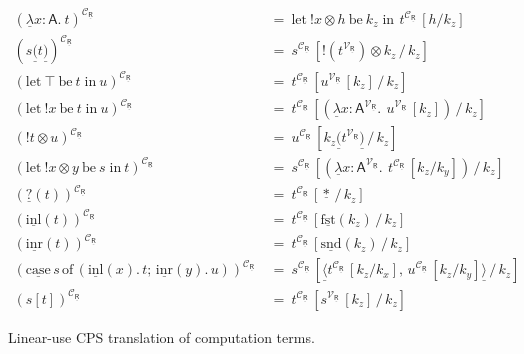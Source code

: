 \documentclass{LMCS}
\newcommand{\comptype}[1]{\underline{#1}}
\newcommand{\VA}{\mathsf{A}}
\newcommand{\CR}{\comptype{\mathsf{R}}}
\newcommand{\In}[2]{#1 \colon  \! #2}
\newcommand{\compop}[1]{\underline{#1}}
\newcommand{\Cstar}{\compop{*}}
\newcommand{\Cpair}[2]{\compop{\langle} #1 , #2 \compop{\rangle}}
\newcommand{\Cfst}[1]{\compop{\mathrm{fst}}(#1)}
\newcommand{\Csnd}[1]{\compop{\mathrm{snd}}(#1)}
\newcommand{\Clam}[3]{\compop{\lambda} \In{#1}{#2}.\: #3}
\newcommand{\Cappl}[2]{#1\compop{(}#2\compop{)}}
\newcommand{\bang}[1]{{! #1}}
\newcommand{\Itop}{\top}
\newcommand{\Ilet}[2]{\mathrm{let}\: {\Itop}\:\mathrm{be}\:{#1} \;\mathrm{in}\: #2}
\newcommand{\banglet}[3]{\mathrm{let}\: {\bang #1}\:\mathrm{be}\:{#2} \;\mathrm{in}\: #3}
\newcommand{\lappl}[2]{#1[#2]}
\newcommand{\copowerterm}[2]{{\bang{#1}}\! \otimes \! #2}
\newcommand{\copowerlet}[4]{\mathrm{let}\: {\copowerterm{#1}{#2}}\:\mathrm{be}\:{#3} \;\mathrm{in}\: #4}
\newcommand{\Cimage}[1]{\compop{?}(#1)}
\newcommand{\Cinl}[1]{\compop{\mathrm{inl}}(#1)}
\newcommand{\Cinr}[1]{\compop{\mathrm{inr}}(#1)}
\newcommand{\Ccase}[5]{\compop{\mathrm{case}} \, #1 \,\mathrm{of}\,( \Cinl{#2}. \, #3 ; \, \Cinr{#4}. \, #5)}
\newcommand{\CpsVT}[1]{#1^{\mathcal{V}_{\CR}}}
\newcommand{\CpsCT}[1]{#1^{\mathcal{C}_{\CR}}}
\begin{document}
\begin{figure}[h!]
\begin{align*}
\CpsCT{(\Clam{x}{\VA}{t})}  & \: = \:  
   \copowerlet{x}{h}{k_z}{\,\CpsCT{t}\,[h/k_z]} 
\\
\CpsCT{(\Cappl{s}{t})}  & \: = \:  
   \CpsCT{s}\,[\copowerterm{(\CpsVT{t})}{k_z} \, / \, k_z]
\\
\CpsCT{(\Ilet{t}{u})}  & \: = \:  
   \CpsCT{t}\,[\lappl{\CpsVT{u}\,}{k_z} \, / \, k_z]
\\
\CpsCT{(\banglet{x}{t}{u})}  & \: = \:  
   \CpsCT{t}\,[(\Clam{x}{\CpsVT{\VA}}{\,\lappl{\CpsVT{u}\,}{k_z}})\, / \, k_z]
\\
\CpsCT{(\copowerterm{t}{u})}  & \: = \:  
   \CpsCT{u}\,[\Cappl{k_z}{\CpsVT{t}} \, / \, k_z]
\\
\CpsCT{(\copowerlet{x}{y}{s}{t})}  & \: = \:  
   \CpsCT{s}\,[(\Clam{x}{\CpsVT{\VA}}{\,\CpsCT{t}\,[k_z/k_y]})\, / \, k_z] 
\\
\CpsCT{(\Cimage{t})}  & \: = \:  \CpsCT{t}\,[\Cstar \, / \, k_z]
\\
\CpsCT{(\Cinl{t})}  & \: = \:  \CpsCT{t}\,[\Cfst{k_z} \, / \, k_z]
\\
\CpsCT{(\Cinr{t})}  & \: = \:  \CpsCT{t}\,[\Csnd{k_z} \, / \, k_z]
\\ 
\CpsCT{(\Ccase{s}{x}{t}{y}{u})}  & \: = \:  
   \CpsCT{s}\,[\Cpair{\CpsCT{t}\,[k_z/k_x]}{\,\CpsCT{u}\,[k_z/k_y]} \, / \, k_z] 
\\
\CpsCT{(\lappl{s}{t})}  & \: = \:  
   \CpsCT{t}\,[\lappl{\CpsVT{s}\,}{k_z} \, / \, k_z]
\end{align*}
\caption{Linear-use CPS translation of computation terms.}
\label{fig:cps:compterms}
\vspace*{10pt}
\end{figure}
\end{document}
